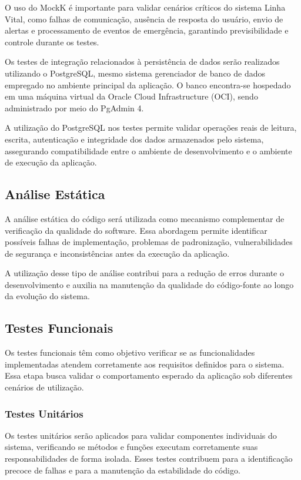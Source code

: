 O uso do MockK é importante para validar cenários críticos do sistema Linha Vital, como falhas de comunicação, ausência de resposta do usuário, envio de alertas e processamento de eventos de emergência, garantindo previsibilidade e controle durante os testes.

Os testes de integração relacionados à persistência de dados serão realizados utilizando o PostgreSQL, mesmo sistema gerenciador de banco de dados empregado no ambiente principal da aplicação. O banco encontra-se hospedado em uma máquina virtual da Oracle Cloud Infrastructure (OCI), sendo administrado por meio do PgAdmin 4.

A utilização do PostgreSQL nos testes permite validar operações reais de leitura, escrita, autenticação e integridade dos dados armazenados pelo sistema, assegurando compatibilidade entre o ambiente de desenvolvimento e o ambiente de execução da aplicação.

\subsection{Análise Estática}

A análise estática do código será utilizada como mecanismo complementar de verificação da qualidade do software. Essa abordagem permite identificar possíveis falhas de implementação, problemas de padronização, vulnerabilidades de segurança e inconsistências antes da execução da aplicação.

A utilização desse tipo de análise contribui para a redução de erros durante o desenvolvimento e auxilia na manutenção da qualidade do código-fonte ao longo da evolução do sistema.

\subsection{Testes Funcionais}

Os testes funcionais têm como objetivo verificar se as funcionalidades implementadas atendem corretamente aos requisitos definidos para o sistema. Essa etapa busca validar o comportamento esperado da aplicação sob diferentes cenários de utilização.

\subsubsection{Testes Unitários}

Os testes unitários serão aplicados para validar componentes individuais do sistema, verificando se métodos e funções executam corretamente suas responsabilidades de forma isolada. Esses testes contribuem para a identificação precoce de falhas e para a manutenção da estabilidade do código.

